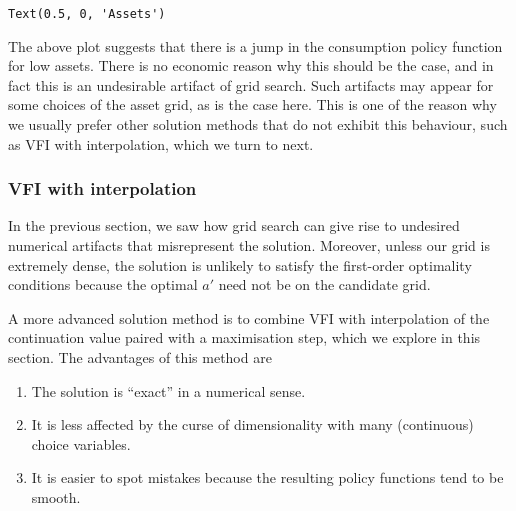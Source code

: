 \documentclass{scrartcl}
\makeatletter
\providecommand{\tightlist}{%
      \setlength{\itemsep}{0pt}\setlength{\parskip}{0pt}}
\newcommand{\boxspacing}{\kern\kvtcb@left@rule\kern\kvtcb@boxsep}
\newcommand{\prompt}[4]{
        {\ttfamily\llap{{\color{#2}[#3]:\hspace{3pt}#4}}\vspace{-\baselineskip}}
    }
\makeatother
\begin{document}
            \begin{tcolorbox}[breakable, size=fbox, boxrule=.5pt, pad at break*=1mm, opacityfill=0]
\prompt{Out}{outcolor}{7}{\boxspacing}
\begin{Verbatim}[commandchars=\\\{\}]
Text(0.5, 0, 'Assets')
\end{Verbatim}
\end{tcolorbox}
        
    \begin{center}
    \end{center}
    
    The above plot suggests that there is a jump in the consumption policy
function for low assets. There is no economic reason why this should be
the case, and in fact this is an undesirable artifact of grid search.
Such artifacts may appear for some choices of the asset grid, as is the
case here. This is one of the reason why we usually prefer other
solution methods that do not exhibit this behaviour, such as VFI with
interpolation, which we turn to next.

    \hypertarget{vfi-with-interpolation}{%
\subsubsection{VFI with interpolation}\label{vfi-with-interpolation}}

In the previous section, we saw how grid search can give rise to
undesired numerical artifacts that misrepresent the solution. Moreover,
unless our grid is extremely dense, the solution is unlikely to satisfy
the first-order optimality conditions because the optimal \(a'\) need
not be on the candidate grid.

A more advanced solution method is to combine VFI with interpolation of
the continuation value paired with a maximisation step, which we explore
in this section. The advantages of this method are

\begin{enumerate}
\def\labelenumi{\arabic{enumi}.}
\tightlist
\item
  The solution is ``exact'' in a numerical sense.
\item
  It is less affected by the curse of dimensionality with many
  (continuous) choice variables.
\item
  It is easier to spot mistakes because the resulting policy functions
  tend to be smooth.
\end{enumerate}
\end{document}
